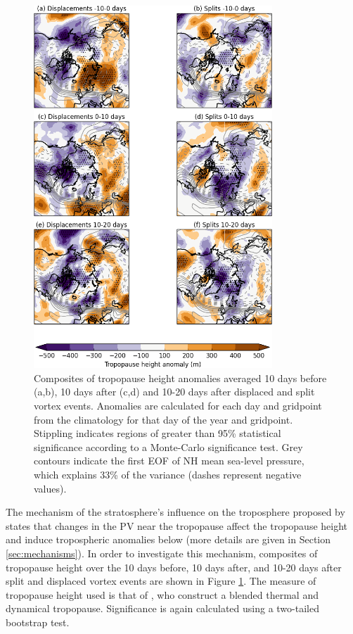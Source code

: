 \begin{figure}
 \centering
 \noindent\includegraphics[width=0.8\textwidth]{figures/chapter-moments/tropopause_height_composites_nam_crop.png}
 \caption[Tropopause height composites for split and displaced vortex
 events.]{Composites of tropopause height anomalies averaged 10 days before
   (a,b), 10 days after (c,d) and 10-20 days after displaced and split vortex
   events. Anomalies are calculated for each day and gridpoint from the
   climatology for that day of the year and gridpoint. Stippling indicates
   regions of greater than 95\% statistical significance according to a
   Monte-Carlo significance test. Grey contours indicate the first EOF of NH
   mean sea-level pressure, which explains 33\% of the variance (dashes
   represent negative values).}
 \label{fig:tropopause_height}
\end{figure}

The mechanism of the stratosphere's influence on the troposphere proposed by
\citet{Ambaum2002} states that changes in the PV near the tropopause affect the
tropopause height and induce tropospheric anomalies below (more details are
given in Section \ref{sec:mechanisms}). In order to investigate this mechanism,
composites of tropopause height over the 10 days before, 10 days after, and
10-20 days after split and displaced vortex events are shown in Figure
\ref{fig:tropopause_height}. The measure of tropopause height used is that of
\citet{Wilcox2012a}, who construct a blended thermal and dynamical
tropopause. Significance is again calculated using a two-tailed bootstrap test. 

